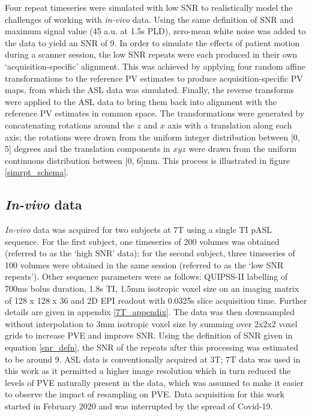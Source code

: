 Four repeat timeseries were simulated with low SNR to realistically model the challenges of working with \textit{in-vivo} data. Using the same definition of SNR and maximum signal value (45 a.u. at 1.5s PLD), zero-mean white noise was added to the data to yield an SNR of 9. In order to simulate the effects of patient motion during a scanner session, the low SNR repeats were each produced in their own `acquisition-specific' alignment. This was achieved by applying four random affine transformations to the reference PV estimates to produce acquisition-specific PV maps, from which the ASL data was simulated. Finally, the reverse transforms were applied to the ASL data to bring them back into alignment with the reference PV estimates in common space. The transformations were generated by concatenating rotations around the $z$ and $x$ axis with a translation along each axis; the rotations were drawn from the uniform integer distribution between [0, 5] degrees and the translation components in $xyz$ were drawn from the uniform continuous distribution between [0, 6]mm. This process is illustrated in figure \ref{simrpt_schema}. 

\subsection{\textit{In-vivo} data}

\textit{In-vivo} data was acquired for two subjects at 7T using a single TI pASL sequence. For the first subject, one timeseries of 200 volumes was obtained (referred to as the `high SNR' data); for the second subject, three timeseries of 100 volumes were obtained in the same session (referred to as the `low SNR repeats'). Other sequence parameters were as follows: QUIPSS-II labelling of 700ms bolus duration, 1.8s TI, 1.5mm isotropic voxel size on an imaging matrix of 128 x 128 x 36 and 2D EPI readout with 0.0325s slice acquisition time. Further details are given in appendix \ref{7T_appendix}. The data was then downsampled without interpolation to 3mm isotropic voxel size by summing over 2x2x2 voxel grids to increase PVE and improve SNR. Using the definition of SNR given in equation \ref{snr_defn}, the SNR of the repeats after this processing was estimated to be around 9. ASL data is conventionally acquired at 3T; 7T data was used in this work as it permitted a higher image resolution which in turn reduced the levels of PVE naturally present in the data, which was assumed to make it easier to observe the impact of resampling on PVE. Data acquisition for this work started in February 2020 and was interrupted by the spread of Covid-19. 

